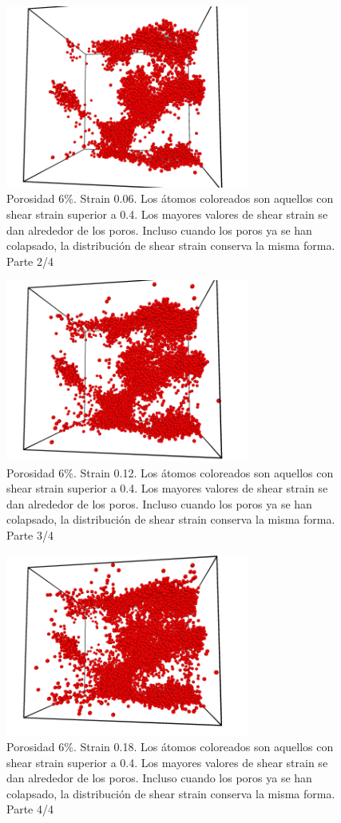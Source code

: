 \documentclass[10pt, oneside]{article} %
\begin{document}
\begin{figure}[H]
\centering
\includegraphics[width=8cm]{Figures/porosidad_6_shearstrain04_006.png}
\caption{Porosidad 6\%. Strain 0.06. Los átomos coloreados son aquellos con shear strain superior a 0.4. Los mayores valores de shear strain se dan alrededor de los poros. Incluso cuando los poros ya se han colapsado, la distribución de shear strain conserva la misma forma. Parte 2/4}
\end{figure}

\begin{figure}[H]
\centering
\includegraphics[width=8cm]{Figures/porosidad_6_shearstrain04_012.png}
\caption{Porosidad 6\%. Strain 0.12. Los átomos coloreados son aquellos con shear strain superior a 0.4. Los mayores valores de shear strain se dan alrededor de los poros. Incluso cuando los poros ya se han colapsado, la distribución de shear strain conserva la misma forma. Parte 3/4}
\end{figure}

\begin{figure}[H]
\centering
\includegraphics[width=8cm]{Figures/porosidad_6_shearstrain04_018.png}
\caption{Porosidad 6\%. Strain 0.18. Los átomos coloreados son aquellos con shear strain superior a 0.4. Los mayores valores de shear strain se dan alrededor de los poros. Incluso cuando los poros ya se han colapsado, la distribución de shear strain conserva la misma forma. Parte 4/4}
\end{figure}
\end{document}
